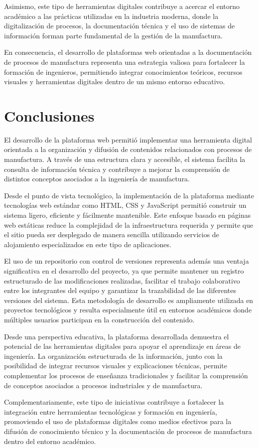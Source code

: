 \documentclass[12pt,letterpaper]{article}
\begin{document}
Asimismo, este tipo de herramientas digitales contribuye a acercar el entorno académico a las prácticas utilizadas en la industria moderna, donde la digitalización de procesos, la documentación técnica y el uso de sistemas de información forman parte fundamental de la gestión de la manufactura.

En consecuencia, el desarrollo de plataformas web orientadas a la documentación de procesos de manufactura representa una estrategia valiosa para fortalecer la formación de ingenieros, permitiendo integrar conocimientos teóricos, recursos visuales y herramientas digitales dentro de un mismo entorno educativo.


\section{Conclusiones}

El desarrollo de la plataforma web permitió implementar una herramienta digital orientada a la organización y difusión de contenidos relacionados con procesos de manufactura. A través de una estructura clara y accesible, el sistema facilita la consulta de información técnica y contribuye a mejorar la comprensión de distintos conceptos asociados a la ingeniería de manufactura.

Desde el punto de vista tecnológico, la implementación de la plataforma mediante tecnologías web estándar como HTML, CSS y JavaScript permitió construir un sistema ligero, eficiente y fácilmente mantenible. Este enfoque basado en páginas web estáticas reduce la complejidad de la infraestructura requerida y permite que el sitio pueda ser desplegado de manera sencilla utilizando servicios de alojamiento especializados en este tipo de aplicaciones.

El uso de un repositorio con control de versiones representa además una ventaja significativa en el desarrollo del proyecto, ya que permite mantener un registro estructurado de las modificaciones realizadas, facilitar el trabajo colaborativo entre los integrantes del equipo y garantizar la trazabilidad de las diferentes versiones del sistema. Esta metodología de desarrollo es ampliamente utilizada en proyectos tecnológicos y resulta especialmente útil en entornos académicos donde múltiples usuarios participan en la construcción del contenido.

Desde una perspectiva educativa, la plataforma desarrollada demuestra el potencial de las herramientas digitales para apoyar el aprendizaje en áreas de ingeniería. La organización estructurada de la información, junto con la posibilidad de integrar recursos visuales y explicaciones técnicas, permite complementar los procesos de enseñanza tradicionales y facilitar la comprensión de conceptos asociados a procesos industriales y de manufactura.

Complementariamente, este tipo de iniciativas contribuye a fortalecer la integración entre herramientas tecnológicas y formación en ingeniería, promoviendo el uso de plataformas digitales como medios efectivos para la difusión de conocimiento técnico y la documentación de procesos de manufactura dentro del entorno académico.
\end{document}
